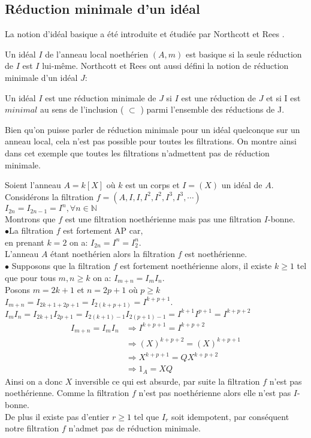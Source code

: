\subsection{Réduction minimale d'un idéal}
La notion d'idéal basique a été introduite et étudiée par Northcott et Rees \cite{No}.
\begin{madefinition}
	Un idéal $I$ de l'anneau local noethérien $(A,m)$ est basique si la seule réduction de $I$ est $I$ lui-m\^{e}me. 
	Northcott et Rees ont aussi défini la notion de réduction minimale
	d'un idéal $J$:
	
	Un idéal $I$ est une réduction minimale de $J$ si $I$ est une réduction de $J$ et si I est $minimal$ au sens de l'inclusion ( $\subset$ ) parmi l'ensemble des réductions de J. 
\end{madefinition}
\begin{maremarque}
	Bien qu'on puisse parler de réduction minimale pour un idéal quelconque sur un anneau local, cela n'est pas possible pour toutes les filtrations. On montre ainsi dans cet exemple que toutes les filtrations n'admettent pas de réduction minimale.
\end{maremarque}
\begin{monexemple}
	Soient l'anneau $A = k\left[ X\right]$ où $k$ est un corps et $I = (X)$ un idéal de $A$.\\
	Considérons la filtration $f = (A, I, I, I^2, I^2, I^3, I^3, \cdots)$\\
	$I_{2n} = I_{2n-1} = I^n, \forall n \in \mathbb{N}$\\
	Montrons que $f$ est une filtration noethérienne mais pas une filtration $I$-bonne.\\
	$\bullet$La filtration $f$ est fortement AP car, \\en prenant $k = 2$ on a: $I_{2n} = I^n = I_2^n$.\\
	L’anneau $A$ étant noethérien alors la filtration $f$ est noethérienne.\\
	$\bullet$ Supposons que la filtration $f$ est fortement noethérienne alors, il existe $k \geq 1$ tel que pour tous $m, n \geq k$ on a: $I_{m+n} = I_m I_n$.\\
	Posons $m = 2k+1$ et $n = 2p+1$ où $p \geq k$\\
	$I_{m+n} = I_{2k+1+2p+1} = I_{2(k+p+1)} = I^{k+p+1}$.\\
	$I_m I_n =  I_{2k+1}  I_{2p+1} =  I_{2(k+1)-1}  I_{2(p+1)-1} = I^{k+1} I^{p+1} = I^{k+p+2}$
	\begin{align*}
		I_{m+n} = I_m I_n &\Rightarrow I^{k+p+1} = I^{k+p+2}\\
		& \Rightarrow (X)^{k+p+2} = (X)^{k+p+1}\\
		&\Rightarrow X^{k+p+1} = QX^{k+p+2}\\
		&\Rightarrow 1_A = XQ
	\end{align*}
	Ainsi on a donc $X$ inversible ce qui est absurde, par suite la filtration $f$ n'est pas noethérienne. Comme la filtration $f$ n'est pas noethérienne alors elle n'est pas $I$-bonne.\\ De plus il existe pas d'entier $r \geq 1$ tel que $I_r$ soit idempotent, par conséquent notre filtration $f$ n'admet pas de réduction minimale.
\end{monexemple}

